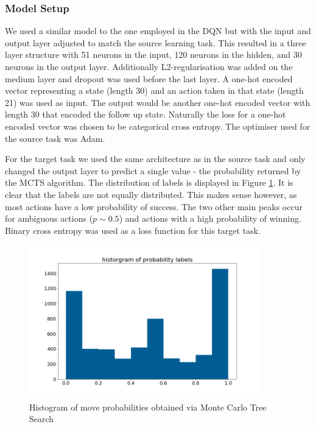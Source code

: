 \documentclass[12pt,a4paper]{article}
\begin{document}
\subsubsection{Model Setup}
We used a similar model to the one employed in the DQN but with the input and output layer adjusted to match the source learning task. This resulted in a three layer structure with 51 neurons in the input, 120 neurons in the hidden, and 30 neurons in the output layer. Additionally L2-regularisation was added on the medium layer and dropout was used before the last layer. A one-hot encoded vector representing a state (length 30) and an action taken in that state (length 21) was used as input. The output would be another one-hot encoded vector with length 30 that encoded the follow up state. Naturally the loss for a one-hot encoded vector was chosen to be categorical cross entropy. The optimiser used for the source task was Adam.

For the target task we used the same architecture as in the source task and only changed the output layer to predict a single value - the probability returned by the MCTS algorithm. The distribution of labels is displayed in Figure \ref{fig:hist_labels}. It is clear that the labels are not equally distributed. This makes sense however, as most actions have a low probability of success. The two other main peaks occur for ambiguous actions ($p \sim 0.5$) and actions with a high probability of winning. Binary cross entropy was used as a loss function for this target task.

\begin{figure}
  \includegraphics[width=10cm]{img/hist_labels.png}
  \centering 
  \caption{Histogram of move probabilities obtained via Monte Carlo Tree Search}
  \label{fig:hist_labels}
\end{figure}
\end{document}
